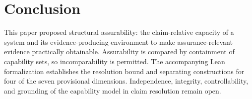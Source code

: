 \section{Conclusion}
\label{aa.sec.conclusion}

This paper proposed structural assurability:
the claim-relative capacity of a system and its evidence-producing environment
to make assurance-relevant evidence practically obtainable.
Assurability is compared by containment of capability sets, so incomparability is permitted.
The accompanying Lean formalization establishes the resolution bound
and separating constructions for four of the seven provisional dimensions.
Independence, integrity, controllability, and grounding of the capability model in claim resolution remain open.
